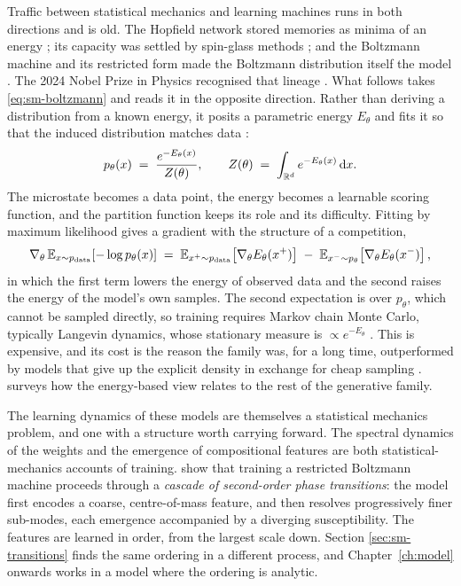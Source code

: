 Traffic between statistical mechanics and learning machines runs in both
directions and is old. The Hopfield network stored memories as minima of an
energy \citep{hopfield1982neural}; its capacity was settled by spin-glass methods
\citep{amit1985storing, mezard1987spin, gardner1988space}; and the Boltzmann
machine and its restricted form made the Boltzmann distribution itself the model
\citep{ackley1985learning, smolensky1986information}. The 2024 Nobel Prize in
Physics recognised that lineage \citep{nobel2024physics}. What follows takes
\eqref{eq:sm-boltzmann} and reads it in the opposite direction. Rather than deriving a distribution from a known energy, it
posits a parametric energy $E_\theta$ and fits it so that the induced
distribution matches data \citep{ackley1985learning, lecun2006tutorial}:
\begin{equation}
  p_\theta(x) \;=\; \frac{e^{-E_\theta(x)}}{Z(\theta)},
  \qquad
  Z(\theta) \;=\; \int_{\mathbb{R}^{d}} e^{-E_\theta(x)}\, \mathrm{d} x .
  \label{eq:sm-ebm}
\end{equation}
The microstate becomes a data point, the energy becomes a learnable scoring
function, and the partition function keeps its role and its difficulty. Fitting
by maximum likelihood gives a gradient with the structure of a competition,
\begin{equation}
  \nabla_\theta\, \mathbb{E}_{x \sim p_{\mathrm{data}}}\!\left[-\log p_\theta(x)\right]
  \;=\;
  \mathbb{E}_{x^{+} \sim p_{\mathrm{data}}}\!\left[\nabla_\theta E_\theta(x^{+})\right]
  \;-\;
  \mathbb{E}_{x^{-} \sim p_{\theta}}\!\left[\nabla_\theta E_\theta(x^{-})\right],
  \label{eq:sm-ebm-grad}
\end{equation}
in which the first term lowers the energy of observed data and the second
raises the energy of the model's own samples. The second expectation is over
$p_\theta$, which cannot be sampled directly, so training requires Markov chain
Monte Carlo, typically Langevin dynamics, whose stationary measure is
$\propto e^{-E_\theta}$ \citep{hinton2002training, robert2004monte}. This is
expensive, and its cost is the reason the family was, for a long time,
outperformed by models that give up the explicit density in exchange for cheap
sampling \citep{goodfellow2014generative, kingma2014auto,
papamakarios2021normalizing}. \citet{carbone2025hitchhiker} surveys how the
energy-based view relates to the rest of the generative family.

The learning dynamics of these models are themselves a statistical mechanics
problem, and one with a structure worth carrying forward. The spectral dynamics
of the weights \citep{decelle2017spectral, mezard2017meanfield} and the
emergence of compositional features \citep{tubiana2017emergence} are both
statistical-mechanics accounts of training. \citet{bachtis2024cascade} show that
training a restricted Boltzmann machine
proceeds through a \emph{cascade of second-order phase transitions}: the model
first encodes a coarse, centre-of-mass feature, and then resolves progressively
finer sub-modes, each emergence accompanied by a diverging susceptibility. The
features are learned in order, from the largest scale down. Section
\ref{sec:sm-transitions} finds the same ordering in a different process, and
Chapter~\ref{ch:model} onwards works in a model where the ordering is
analytic.

